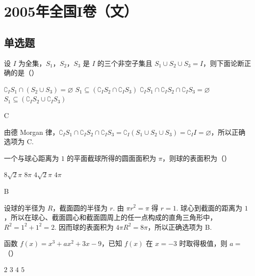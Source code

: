 \chapter{2005年全国I卷（文）}
\section{单选题}
\begin{problem}
设 \(I\) 为全集，\(S_{1}\)，\(S_{2}\)，\(S_{3}\) 是 \(I\) 的三个非空子集且 \(S_{1} \cup S_{2} \cup S_{3} = I\)，则下面论断正确的是（\quad）

\choices
    {\(\complement_{I}S_{1}\cap (S_{2}\cup S_{3}) = \varnothing\)}
    {\(S_{1}\subseteq (\complement_{I}S_{2}\cap \complement_{I}S_{3})\)}
    {\(\complement_{I}S_{1}\cap \complement_{I}S_{2}\cap \complement_{I}S_{3} = \varnothing\)}
    {\(S_{1}\subseteq (\complement_{I}S_{2}\cup \complement_{I}S_{3})\)}
\end{problem}

\begin{answer}
C
\end{answer}

\begin{solution}
由德 Morgan 律，\(\complement_{I}S_{1}\cap\complement_{I}S_{2}\cap\complement_{I}S_{3}=\complement_{I}(S_{1}\cup S_{2}\cup S_{3})=\complement_{I}I=\varnothing\)，所以正确选项为 C.
\end{solution}

\begin{problem}
一个与球心距离为 \(1\) 的平面截球所得的圆面面积为 \(\pi\)，则球的表面积为（\quad）

\choices
    {\(8\sqrt{2}\pi\)}
    {\(8\pi\)}
    {\(4\sqrt{2}\pi\)}
    {\(4\pi\)}
\end{problem}

\begin{answer}
B
\end{answer}

\begin{solution}
设球的半径为 \(R\)，截面圆的半径为 \(r\). 由 \(\pi r^{2}=\pi\) 得 \(r=1\). 球心到截面的距离为 \(1\)，所以在球心、截面圆心和截面圆周上的任一点构成的直角三角形中，\(R^{2}=1^{2}+1^{2}=2\). 因而球的表面积为 \(4\pi R^{2}=8\pi\)，所以正确选项为 B.
\end{solution}

\begin{problem}
函数 \(f(x) = x^3 + ax^2 + 3x - 9\)，已知 \(f(x)\) 在 \(x=-3\) 时取得极值，则 \(a=\)（\quad）

\choices
    {\(2\)}
    {\(3\)}
    {\(4\)}
    {\(5\)}
\end{problem}

